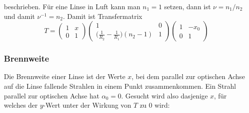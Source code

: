 beschrieben.
Für eine Linse in Luft kann man $n_1=1$ setzen, dann ist $\nu=n_1/n_2$
und damit $\nu^{-1}=n_2$.
Damit ist Transfermatrix
\[
T
=
\begin{pmatrix}
1&x\\
0&1
\end{pmatrix}
\begin{pmatrix}
1&0\\
\displaystyle
\biggl(\frac1{R_2}-\frac1{R_1}\biggr)(n_2-1)
&1
\end{pmatrix}
\begin{pmatrix}
1&-x_0\\
0&1
\end{pmatrix}
\]

\subsubsection{Brennweite}
Die Brennweite einer Linse ist der Werte $x$, bei dem parallel zur
optischen Achse auf die Linse fallende Strahlen in einem Punkt
zusammenkommen.
Ein Strahl parallel zur optischen Achse hat $\alpha_0=0$.
Gesucht wird also dasjenige $x$, für welches der $y$-Wert unter der
Wirkung von $T$ zu $0$ wird:
